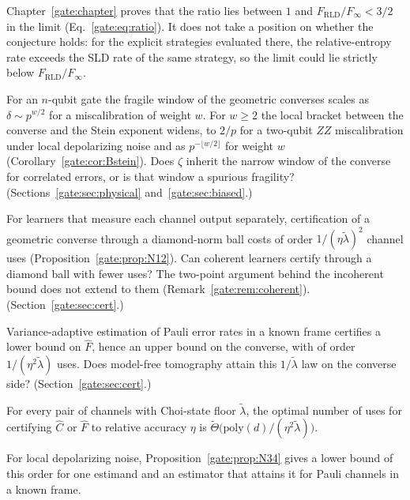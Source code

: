 \noindent Chapter~\ref{gate:chapter} proves that the ratio lies between $1$ and $F_{\mathrm{RLD}}/F_\infty<3/2$ in the limit (Eq.~\eqref{gate:eq:ratio}). It does not take a position on whether the conjecture holds: for the explicit strategies evaluated there, the relative-entropy rate exceeds the SLD rate of the same strategy, so the limit could lie strictly below $F_{\mathrm{RLD}}/F_\infty$.

\begin{problem}\label{op:prob:correlated}
For an $n$-qubit gate the fragile window of the geometric converses scales as $\delta\sim p^{w/2}$ for a miscalibration of weight $w$. For $w\ge2$ the local bracket between the converse and the Stein exponent widens, to $2/p$ for a two-qubit $ZZ$ miscalibration under local depolarizing noise and as $p^{-\lfloor w/2\rfloor}$ for weight $w$ (Corollary~\ref{gate:cor:Bstein}). Does $\zeta$ inherit the narrow window of the converse for correlated errors, or is that window a spurious fragility? (Sections~\ref{gate:sec:physical} and~\ref{gate:sec:biased}.)
\end{problem}

\begin{problem}\label{op:prob:coherent}
For learners that measure each channel output separately, certification of a geometric converse through a diamond-norm ball costs of order $1/(\eta\tilde\lambda)^2$ channel uses (Proposition~\ref{gate:prop:N12}). Can coherent learners certify through a diamond ball with fewer uses? The two-point argument behind the incoherent bound does not extend to them (Remark~\ref{gate:rem:coherent}). (Section~\ref{gate:sec:cert}.)
\end{problem}

\begin{problem}\label{op:prob:model free}
Variance-adaptive estimation of Pauli error rates in a known frame certifies a lower bound on $\widehat F$, hence an upper bound on the converse, with of order $1/(\eta^2\tilde\lambda)$ uses. Does model-free tomography attain this $1/\tilde\lambda$ law on the converse side? (Section~\ref{gate:sec:cert}.)
\end{problem}

\begin{conjecture}\label{op:conj:cert}
For every pair of channels with Choi-state floor $\tilde\lambda$, the optimal number of uses for certifying $\widehat C$ or $\widehat F$ to relative accuracy $\eta$ is $\widetilde\Theta\big(\mathrm{poly}(d)/(\eta^2\tilde\lambda)\big)$.
\end{conjecture}

\noindent For local depolarizing noise, Proposition~\ref{gate:prop:N34} gives a lower bound of this order for one estimand and an estimator that attains it for Pauli channels in a known frame.

\endgroup
